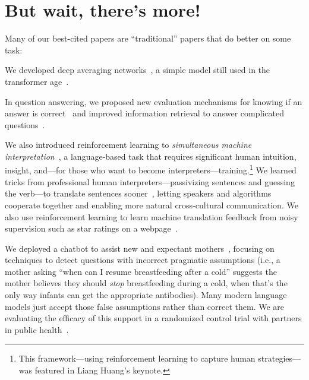 \section{But wait, there's more!}

Many of our best-cited papers are ``traditional'' papers that do
better on some task:
%
\begin{itemize*}
\item We developed deep averaging networks~\cite[]{iyyer-15}, a simple model still used in the 
transformer age~\cite{ye-22}.
\item In question answering, we proposed new evaluation mechanisms
  for knowing if an answer is correct~\cite{si-21} and improved
  information retrieval to answer complicated
  questions~\cite{elgohary-19,shi-20,zhao-21}.

\item We also introduced reinforcement learning to \emph{simultaneous
machine interpretation}~\cite{Grissom:He:Boyd-Graber:Morgan-2014}, a
  language-based task that requires significant human intuition,
  insight, and---for those who want to become
  interpreters---training.\footnote{This framework---using
  reinforcement learning to capture human strategies---was featured in
  Liang Huang's  keynote.} We learned tricks from
  professional human interpreters---passivizing sentences and guessing
  the verb---to translate sentences sooner~\cite{He-15}, letting
  speakers and algorithms cooperate together and enabling more natural
  cross-cultural communication.  We also use reinforcement
  learning to learn machine translation feedback from noisy
  supervision such as star ratings on a webpage~\cite{nguyen-17}.
  
  \item We deployed a chatbot to assist new and expectant mothers~\cite{Srikanth:Sarkar:Y.:M.:C.:Rudinger:Boyd-Graber-2024}, focusing on techniques to detect questions with incorrect pragmatic assumptions (i.e., a mother asking ``when can I resume breastfeeding after a cold'' suggests the mother believes they should \emph{stop} breastfeeding during a cold, when that's the only way infants can get the appropriate antibodies).  Many modern language models just accept those false assumptions rather than correct them.  We are evaluating the efficacy of this support in a randomized control trial with partners in public health~\cite{Y.:Amara:Ximena:Michelle:Xiaohe:Srikanth:Sourabh:Abby:Ann:Pragat:Xin:Boyd-Graber:M.:C.-2023}.
\end{itemize*}

